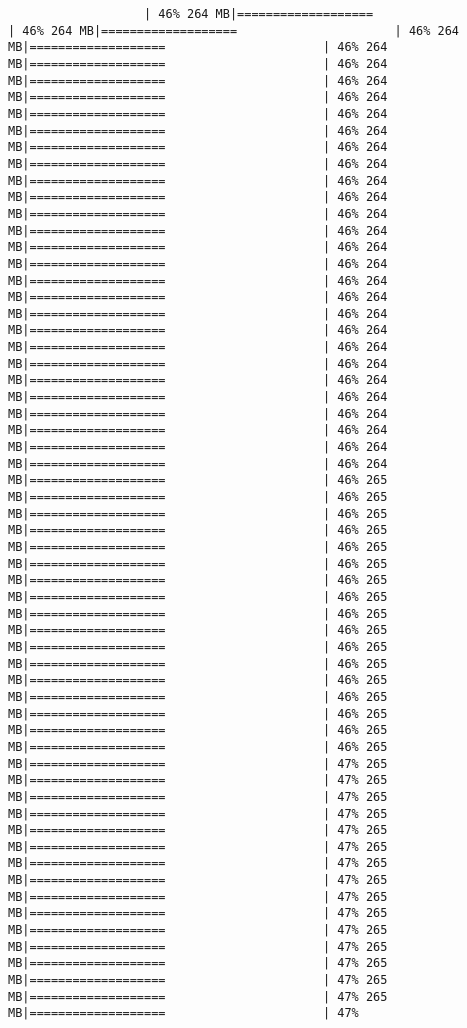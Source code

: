 \documentclass[
]{article}
\begin{document}
\begin{verbatim}
                   | 46% 264 MB|===================                      | 46% 264 MB|===================                      | 46% 264 MB|===================                      | 46% 264 MB|===================                      | 46% 264 MB|===================                      | 46% 264 MB|===================                      | 46% 264 MB|===================                      | 46% 264 MB|===================                      | 46% 264 MB|===================                      | 46% 264 MB|===================                      | 46% 264 MB|===================                      | 46% 264 MB|===================                      | 46% 264 MB|===================                      | 46% 264 MB|===================                      | 46% 264 MB|===================                      | 46% 264 MB|===================                      | 46% 264 MB|===================                      | 46% 264 MB|===================                      | 46% 264 MB|===================                      | 46% 264 MB|===================                      | 46% 264 MB|===================                      | 46% 264 MB|===================                      | 46% 264 MB|===================                      | 46% 264 MB|===================                      | 46% 264 MB|===================                      | 46% 264 MB|===================                      | 46% 264 MB|===================                      | 46% 264 MB|===================                      | 46% 264 MB|===================                      | 46% 265 MB|===================                      | 46% 265 MB|===================                      | 46% 265 MB|===================                      | 46% 265 MB|===================                      | 46% 265 MB|===================                      | 46% 265 MB|===================                      | 46% 265 MB|===================                      | 46% 265 MB|===================                      | 46% 265 MB|===================                      | 46% 265 MB|===================                      | 46% 265 MB|===================                      | 46% 265 MB|===================                      | 46% 265 MB|===================                      | 46% 265 MB|===================                      | 46% 265 MB|===================                      | 46% 265 MB|===================                      | 46% 265 MB|===================                      | 47% 265 MB|===================                      | 47% 265 MB|===================                      | 47% 265 MB|===================                      | 47% 265 MB|===================                      | 47% 265 MB|===================                      | 47% 265 MB|===================                      | 47% 265 MB|===================                      | 47% 265 MB|===================                      | 47% 265 MB|===================                      | 47% 265 MB|===================                      | 47% 265 MB|===================                      | 47% 265 MB|===================                      | 47% 265 MB|===================                      | 47% 265 MB|===================                      | 47% 265 MB|===================                      | 47% 
\end{verbatim}
\end{document}
